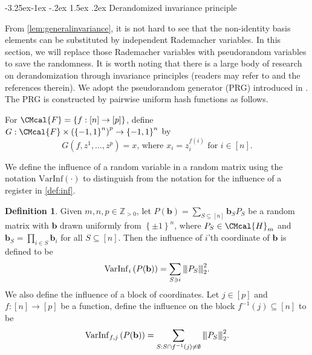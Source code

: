 \documentclass[11pt]{article}
\makeatletter
\renewcommand{\subsection}{\@startsection{subsection}{2}{\z@}%
             {-3.25ex\@plus -1ex \@minus -.2ex}%
             {1.5ex \@plus .2ex}%
             {\normalfont\large\scshape\bfseries}}
\def\F{\CMcal{F}}
\def\H{\CMcal{H}}
\theoremstyle{plain}
\theoremstyle{definition}
\newtheorem{definition}[theorem]{Definition}
\newcommand {\set} [1] {\ensuremath{ \left\lbrace #1 \right\rbrace }}
\newcommand {\br} [1] {\ensuremath{ \left( #1 \right) }}
\newcommand{\nnorm}[1]{{\left\vert\kern-0.25ex\left\vert\kern-0.25ex\left\vert #1
		\right\vert\kern-0.25ex\right\vert\kern-0.25ex\right\vert}}
\newcommand{\posint}{{\mathbb Z}_{>0}}
\newcommand{\randb}{\ensuremath{\mathbf{b}}}
\newcommand{\varinfi}[1]{\ensuremath{\mathrm{VarInf}_i}\br{#1}}
\newcommand{\inffj}[1]{\ensuremath{\mathrm{VarInf}_{f,j}}\br{#1}}
\newcommand{\invf}[1]{\ensuremath{f^{-1}\br{#1}}}
\newcommand{\bits}[1]{\ensuremath{\set{-1,1}^{#1}}}
\newcommand{\1}{\mathbb{1}} %
\makeatother
\begin{document}
%
\subsection{Derandomized invariance principle}\label{sec:derandomize}

From \cref{lem:generalinvariance}, it is not hard to see that the non-identity basis elements can be substituted by independent Rademacher variables. In this section, we will replace those Rademacher variables with pseudorandom variables to save the randomness.  It is worth noting that there is a large body of research on derandomization through invariance principles (readers may refer to\cite{10.1145/3460532} and the references therein). We adopt the pseudorandom generator (PRG) introduced in \cite{10.1145/1806689.1806749}. The PRG is constructed by pairwise uniform hash functions as follows.

  For $\F=\set{f: [n]\to[p]}$,
  define $G:\F\times\br{\bits{n}}^p\to\bits{n}$ by 
  \begin{equation}\label{eq:derandomize-G-def}
  G\br{f,z^1,\dots,z^p}=x\text{, where }x_{i}=z^{f(i)}_{i}\text{ for }i\in[n].
  \end{equation}

We define the influence of a random variable in a random matrix using the notation $\mathrm{VarInf}\br{\cdot}$ to distinguish from the notation for the influence of a register in \cref{def:inf}.
\begin{definition}
Given $m,n,p\in\posint$, let $P(\randb)=\sum_{S\subseteq[n]}\randb_SP_S$ be a random matrix with $\randb$ drawn uniformly from $\set{\pm 1}^n$, where $P_S\in\H_m$ and $\randb_S=\prod_{i\in S}\randb_i$ for all $S\subseteq[n]$. Then the influence of $i$'th coordinate of $\randb$ is defined to be
\[\varinfi{P(\randb)}=\sum_{S\ni i}\nnorm{P_S}_2^2.\]
We also define the influence of a block of coordinates.
Let $j\in[p]$ and $f:[n]\to[p]$ be a function, define the influence on the block $f^{-1}(j)\subseteq[n]$ to be
\[\inffj{P(\randb)}=\sum_{S:S\cap \invf{j}\ne\emptyset}\nnorm{P_S}_2^2.\]
\end{definition}
\end{document}
